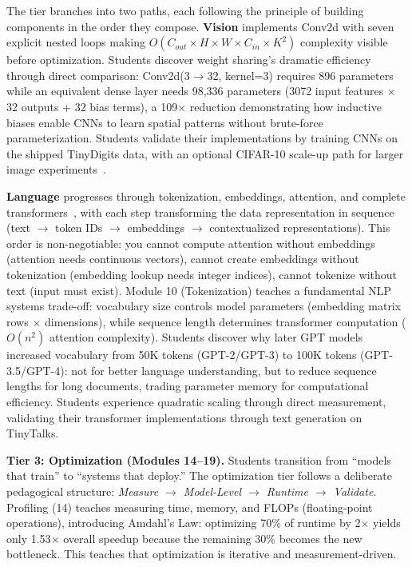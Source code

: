 \documentclass[10pt,twocolumn]{article}
\begin{document}
The tier branches into two paths, each following the principle of building components in the order they compose. \textbf{Vision} implements Conv2d with seven explicit nested loops making $O(C_{out} \times H \times W \times C_{in} \times K^2)$ complexity visible before optimization. Students discover weight sharing's dramatic efficiency through direct comparison: Conv2d(3$\rightarrow$32, kernel=3) requires 896 parameters while an equivalent dense layer needs 98,336 parameters (3072 input features $\times$ 32 outputs + 32 bias terms), a 109$\times$ reduction demonstrating how inductive biases enable CNNs to learn spatial patterns without brute-force parameterization. Students validate their implementations by training CNNs on the shipped TinyDigits data, with an optional CIFAR-10 scale-up path for larger image experiments~\citep{krizhevsky2009cifar, lecun1998}.

\textbf{Language} progresses through tokenization, embeddings, attention, and complete transformers~\citep{vaswani2017attention}, with each step transforming the data representation in sequence (text $\rightarrow$ token IDs $\rightarrow$ embeddings $\rightarrow$ contextualized representations). This order is non-negotiable: you cannot compute attention without embeddings (attention needs continuous vectors), cannot create embeddings without tokenization (embedding lookup needs integer indices), cannot tokenize without text (input must exist). Module 10 (Tokenization) teaches a fundamental NLP systems trade-off: vocabulary size controls model parameters (embedding matrix rows $\times$ dimensions), while sequence length determines transformer computation ($O(n^2)$ attention complexity). Students discover why later GPT models increased vocabulary from 50K tokens (GPT-2/GPT-3) to 100K tokens (GPT-3.5/GPT-4): not for better language understanding, but to reduce sequence lengths for long documents, trading parameter memory for computational efficiency. Students experience quadratic scaling through direct measurement, validating their transformer implementations through text generation on TinyTalks.

\textbf{Tier 3: Optimization (Modules 14--19).}
Students transition from ``models that train'' to ``systems that deploy.'' The optimization tier follows a deliberate pedagogical structure: \emph{Measure $\rightarrow$ Model-Level $\rightarrow$ Runtime $\rightarrow$ Validate}. Profiling (14) teaches measuring time, memory, and FLOPs (floating-point operations), introducing Amdahl's Law: optimizing 70\% of runtime by 2$\times$ yields only 1.53$\times$ overall speedup because the remaining 30\% becomes the new bottleneck. This teaches that optimization is iterative and measurement-driven.
\end{document}
